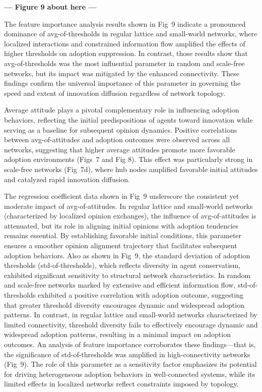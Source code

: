 \documentclass[10pt,letterpaper]{article}
\begin{document}


\begin{center}\textbf{--- Figure 9 about here ---}\end{center}


The feature importance analysis results shown in Fig~9 indicate a pronounced dominance of avg-of-thresholds in regular lattice and small-world networks, where localized interactions and constrained information flow amplified the effects of higher thresholds on adoption suppression. In contrast, those results show that avg-of-thresholds was the most influential parameter in random and scale-free networks, but its impact was mitigated by the enhanced connectivity. These findings confirm the universal importance of this parameter in governing the speed and extent of innovation diffusion regardless of network topology.

Average attitude plays a pivotal complementary role in influencing adoption behaviors, reflecting the initial predispositions of agents toward innovation while serving as a baseline for subsequent opinion dynamics. Positive correlations between avg-of-attitudes and adoption outcomes were observed across all networks, suggesting that higher average attitudes promote more favorable adoption environments (Figs~7 and Fig 8). This effect was particularly strong in scale-free networks (Fig~7d), where hub nodes amplified favorable initial attitudes and catalyzed rapid innovation diffusion.

The regression coefficient data shown in Fig~9 underscore the consistent yet moderate impact of avg-of-attitudes. In regular lattice and small-world networks (characterized by localized opinion exchanges), the influence of avg-of-attitudes is attenuated, but its role in aligning initial opinions with adoption tendencies remains essential. By establishing favorable initial conditions, this parameter ensures a smoother opinion alignment trajectory that facilitates subsequent adoption behaviors. Also as shown in Fig~9, the standard deviation of adoption thresholds (std-of-thresholds), which reflects diversity in agent conservatism, exhibited significant sensitivity to structural network characteristics. In random and scale-free networks marked by extensive and efficient information flow, std-of-thresholds exhibited a positive correlation with adoption outcome, suggesting that greater threshold diversity encourages dynamic and widespread adoption patterns. In contrast, in regular lattice and small-world networks characterized by limited connectivity, threshold diversity fails to effectively encourage dynamic and widespread adoption patterns, resulting in a minimal impact on adoption outcomes. An analysis of feature importance corroborates these findings---that is, the significance of std-of-thresholds was amplified in high-connectivity networks (Fig~9). The role of this parameter as a sensitivity factor emphasizes its potential for driving heterogeneous adoption behaviors in well-connected systems, while its limited effects in localized networks reflect constraints imposed by topology.
\end{document}
